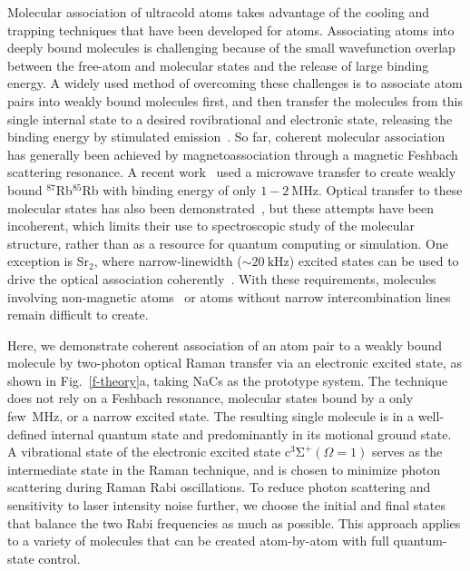 \documentclass[aps,prx,twocolumn,10pt,superscriptaddress]{revtex4-2}
\begin{document}
Molecular association of ultracold atoms takes advantage of the cooling and trapping techniques
that have been developed for atoms.
Associating atoms into deeply bound molecules is challenging
because of the small wavefunction overlap between the free-atom and molecular states
and the release of large binding energy.
A widely used method of overcoming these challenges is to associate atom pairs
into weakly bound molecules first,
and then transfer the molecules from this single internal state
to a desired rovibrational and electronic state,
releasing the binding energy by stimulated emission~\cite{Danzl2008, Ni2008, Lang2008,
  Takekoshi2014, Molony2014, Park2015, Guo2016, Kondov2019, Voges2020}.
So far, coherent molecular association has generally been achieved by magnetoassociation
through a magnetic Feshbach scattering resonance. A recent work~\cite{He331} used a microwave transfer to create weakly bound $^{87}$Rb$^{85}$Rb with binding energy of only  $1-2~\mathrm{MHz}$. Optical transfer to these molecular states has also been demonstrated~\cite{Wynar2000,Rom2004,Liu2019}, but these attempts have been incoherent,
which limits their use to spectroscopic study of the molecular structure,
rather than as a resource for quantum computing or simulation.
One exception is Sr$_2$, where narrow-linewidth ($\sim 20~\mathrm{kHz}$) excited states
can be used to drive the optical association coherently~\cite{Stellmer2012,Reinaudi2012}.
With these requirements, molecules involving non-magnetic atoms~\cite{PhysRevX.10.031037}
or atoms without narrow intercombination lines remain difficult to create.

Here, we demonstrate coherent association of an atom pair to a weakly bound molecule
by two-photon optical Raman transfer via an electronic excited state,
as shown in Fig.~\ref{f-theory}a, taking NaCs as the prototype system.
The technique does not rely on a Feshbach resonance,
molecular states bound by a only few~MHz, or a narrow excited state.
The resulting single molecule is in a well-defined internal quantum state
and predominantly in its motional ground state.
A vibrational state of the electronic excited state $\mathrm{c^3\Sigma^+}(\Omega = 1)$
serves as the intermediate state in the Raman technique,
and is chosen to minimize photon scattering during Raman Rabi oscillations.
To reduce photon scattering and sensitivity to laser intensity noise further,
we choose the initial and final states that balance the two Rabi frequencies as much as possible.
This approach applies to a variety of molecules that can be created atom-by-atom
with full quantum-state control.
\end{document}
